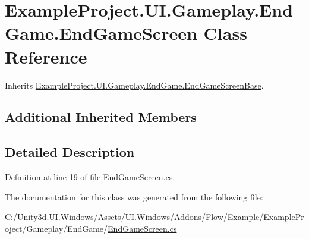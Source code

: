 \hypertarget{class_example_project_1_1_u_i_1_1_gameplay_1_1_end_game_1_1_end_game_screen}{}\section{Example\+Project.\+U\+I.\+Gameplay.\+End\+Game.\+End\+Game\+Screen Class Reference}
\label{class_example_project_1_1_u_i_1_1_gameplay_1_1_end_game_1_1_end_game_screen}


Inherits \hyperlink{class_example_project_1_1_u_i_1_1_gameplay_1_1_end_game_1_1_end_game_screen_base}{Example\+Project.\+U\+I.\+Gameplay.\+End\+Game.\+End\+Game\+Screen\+Base}.

\subsection*{Additional Inherited Members}


\subsection{Detailed Description}


Definition at line 19 of file End\+Game\+Screen.\+cs.



The documentation for this class was generated from the following file\+:\begin{DoxyCompactItemize}
\item 
C\+:/\+Unity3d.\+U\+I.\+Windows/\+Assets/\+U\+I.\+Windows/\+Addons/\+Flow/\+Example/\+Example\+Project/\+Gameplay/\+End\+Game/\hyperlink{_end_game_screen_8cs}{End\+Game\+Screen.\+cs}\end{DoxyCompactItemize}
